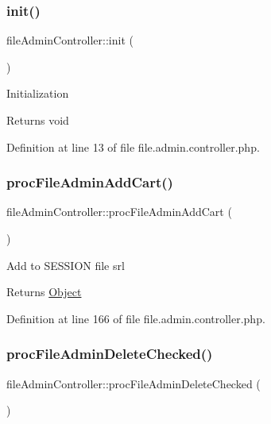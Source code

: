 \subsubsection{\texorpdfstring{init()}{init()}}
{\footnotesize\ttfamily file\+Admin\+Controller\+::init (\begin{DoxyParamCaption}{ }\end{DoxyParamCaption})}

Initialization \begin{DoxyReturn}{Returns}
void 
\end{DoxyReturn}


Definition at line 13 of file file.\+admin.\+controller.\+php.

\mbox{\label{classfileAdminController_a9ba55f911e0f616159687149b0b37fc3}} 
\subsubsection{\texorpdfstring{proc\+File\+Admin\+Add\+Cart()}{procFileAdminAddCart()}}
{\footnotesize\ttfamily file\+Admin\+Controller\+::proc\+File\+Admin\+Add\+Cart (\begin{DoxyParamCaption}{ }\end{DoxyParamCaption})}

Add to S\+E\+S\+S\+I\+ON file srl

\begin{DoxyReturn}{Returns}
\hyperlink{classObject}{Object} 
\end{DoxyReturn}


Definition at line 166 of file file.\+admin.\+controller.\+php.

\mbox{\label{classfileAdminController_a0f3042e741a71e3223ea0c9af2d224a4}} 
\subsubsection{\texorpdfstring{proc\+File\+Admin\+Delete\+Checked()}{procFileAdminDeleteChecked()}}
{\footnotesize\ttfamily file\+Admin\+Controller\+::proc\+File\+Admin\+Delete\+Checked (\begin{DoxyParamCaption}{ }\end{DoxyParamCaption})}

